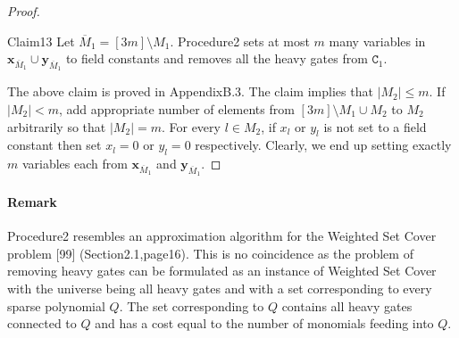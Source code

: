 \begin{proof}
\begin{authorclaim}{Claim13}
Let $\overline M_1=[3m]\setminus M_1$. Procedure2 sets at most $m$ many variables in $\mathbf x_{\overline M_1}\cup\mathbf y_{\overline M_1}$ to field constants and removes all the heavy gates from $\mathtt C_1$.
\end{authorclaim}
The above claim is proved in AppendixB.3. The claim implies that $|M_2|\le m$. If $|M_2|<m$, add appropriate number of elements from $[3m]\setminus M_1\cup M_2$ to $M_2$ arbitrarily so that $|M_2|=m$. For every $l\in M_2$, if $x_l$ or $y_l$ is not set to a field constant then set $x_l=0$ or $y_l=0$ respectively. Clearly, we end up setting exactly $m$ variables each from $\mathbf x_{\overline M_1}$ and $\mathbf y_{\overline M_1}$.
\end{proof}
\paragraph{Remark}
Procedure2 resembles an approximation algorithm for the Weighted Set Cover problem [99] (Section2.1,page16). This is no coincidence as the problem of removing heavy gates can be formulated as an instance of Weighted Set Cover with the universe being all heavy gates and with a set corresponding to every sparse polynomial $Q$. The set corresponding to $Q$ contains all heavy gates connected to $Q$ and has a cost equal to the number of monomials feeding into $Q$.
